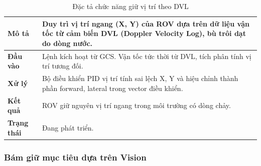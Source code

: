 \documentclass[../DoAn.tex]{subfiles}
\begin{document}
\begin{table}[H]

\centering

\renewcommand{\arraystretch}{1.3}

\begin{tabular}{|l|p{9cm}|}

\hline

\textbf{Mô tả} &
Duy trì vị trí ngang (X, Y) của ROV dựa trên dữ liệu vận
tốc từ cảm biến DVL (Doppler Velocity Log), bù trôi dạt do dòng nước. \\

\hline

\textbf{Đầu vào} &
Lệnh kích hoạt từ GCS. Vận tốc tức thời từ DVL, tích phân
tính vị trí tương đối. \\

\hline

\textbf{Xử lý} &
Bộ điều khiển PID vị trí tính sai lệch X, Y và hiệu chỉnh
thành phần forward, lateral trong vector điều khiển. \\

\hline

\textbf{Kết quả} &
 ROV giữ nguyên vị trí ngang trong môi trường có dòng chảy. \\

\hline

\textbf{Trạng thái} & Đang phát triển. \\

\hline

\end{tabular}

\caption{Đặc tả chức năng giữ vị trí theo DVL}

\label{tab:hold_dvl}

\end{table}

\subsubsection{Bám giữ mục tiêu dựa trên Vision}
\end{document}
